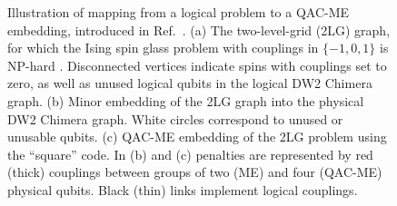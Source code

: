 \begin{figure}[ht]
\begin{center}
\caption{Illustration of mapping from a logical problem to a QAC-ME embedding, introduced in Ref.~\cite{Vinci:2015jt}. (a) The two-level-grid (2LG) graph, for which the Ising spin glass problem with couplings in $\{-1,0,1\}$ is NP-hard \cite{Barahona1982}. Disconnected vertices indicate spins with couplings set to zero, as well as  unused logical qubits in the logical DW2 Chimera graph. (b) Minor embedding of the 2LG graph into the physical DW2 Chimera graph. White circles correspond to unused or unusable qubits. (c) QAC-ME embedding of the 2LG problem using the ``square'' code.
In (b) and (c) penalties are represented by red (thick) couplings between groups of two (ME) and four (QAC-ME) physical qubits. Black (thin) links implement logical couplings.}
\label{fig:square-code}
\end{center}
\end{figure}

